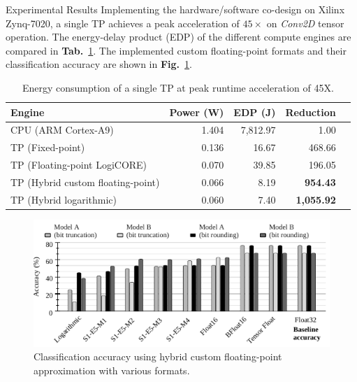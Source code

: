 \documentclass[final]{beamer}
\newlength{\onecolwid}
\newlength{\twocolwid}
\newcommand\fig[1]{\textbf{Fig.}~\ref{#1}}
\newcommand\tab[1]{\textbf{Tab.}~\ref{#1}}
\begin{document}
\begin{frame}[t]
\begin{columns}[t]
\begin{column}{\twocolwid}
\begin{columns}[t,totalwidth=\twocolwid]
\begin{column}{\onecolwid}
\begin{block}{Experimental Results}
	Implementing the hardware/software co-design on Xilinx Zynq-7020, a single TP achieves a peak acceleration of $45\times$ on \emph{Conv2D} tensor operation. The energy-delay product (EDP) of the different compute engines are compared in \tab{tab:energy}. The implemented custom floating-point formats and their classification accuracy are shown in \fig{fig:accuracy}.
	\begin{table}[!htp]\centering
		\caption{Energy consumption of a single TP at peak runtime acceleration of 45X.}\label{tab:energy}
		\scriptsize
		\begin{tabular}{lrrrr}\toprule
			Engine &Power (W) &EDP (J) &Reduction \\\midrule
			CPU (ARM Cortex-A9)&1.404 &7,812.97 &1.00 \\
			TP (Fixed-point) &0.136 &16.67 &468.66 \\
			TP (Floating-point LogiCORE) &0.070 &39.85 &196.05 \\
			TP (Hybrid custom floating-point) &0.066 &8.19 &\textbf{954.43} \\
			TP (Hybrid logarithmic) &0.060 &7.40 &\textbf{1,055.92} \\
			\bottomrule
		\end{tabular}
	\end{table}
	
	\begin{figure}
		\includegraphics[width=\linewidth]{../figures/all_models_accuracy.pdf}
		\caption{Classification accuracy using hybrid custom floating-point approximation with various formats.}
		\label{fig:accuracy}
	\end{figure}
\end{block}


\end{column} %


\end{columns}
\end{column}
\end{columns}
\end{frame}
\end{document}
